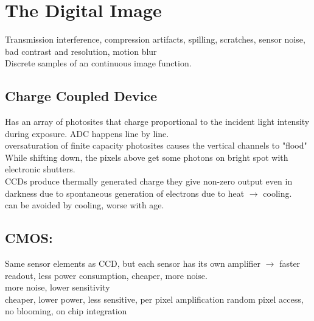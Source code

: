 
\section*{The Digital Image}
 Transmission interference, compression artifacts, spilling, scratches, sensor noise, bad contrast and resolution, motion blur \\
 Discrete samples of an continuous image function.
\subsection*{Charge Coupled Device }
Has an array of photosites  that charge proportional to the incident light intensity during exposure. ADC happens line by line. \\
 oversaturation of finite capacity photosites causes the vertical channels to "flood" \\
 While shifting down, the pixels above get some photons on bright spot with electronic shutters.\\
 CCDs produce thermally generated charge they give non-zero output even in darkness  due to spontaneous generation of electrons due to heat $\rightarrow$ cooling.\\ can be avoided by cooling, worse with age.
\subsection*{CMOS:}
Same sensor elements as CCD, but each sensor has its own amplifier $\rightarrow$ faster readout, less power consumption, cheaper, more noise.\\ more noise, lower sensitivity\\
 cheaper, lower power, less sensitive, per pixel amplification random pixel access, no blooming, on chip integration
